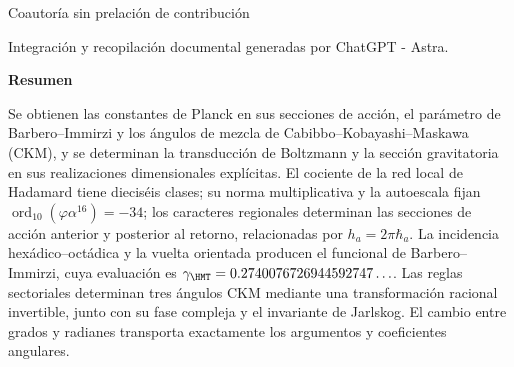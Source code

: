 \thispagestyle{plain}
\enlargethispage{2\baselineskip}
\begingroup
\centering
\setlength{\parskip}{0pt}
{\fontsize{17}{20.5}\selectfont\bfseries\Titulo\par}
\vspace{2pt}
{\fontsize{12}{14.5}\selectfont\Subtitulo\par}
\vspace{5pt}
{\fontsize{11.5}{14}\selectfont\Autores\par}
\vspace{2pt}
{\fontsize{8}{10}\selectfont Coautoría sin prelación de contribución\par}
\vspace{2pt}
{\fontsize{8}{10}\selectfont Integración y recopilación documental generadas por ChatGPT - Astra.\par}
\par\endgroup
\vspace{6pt}
\begingroup\centering\bfseries Resumen\par\endgroup
\vspace{3pt}
\begingroup
\fontsize{9.5}{10.7}\selectfont
\fontsize{9.5}{10.7}\selectfont
\setlength{\parskip}{1.5pt plus .5pt minus .5pt}
\noindent
Se obtienen las constantes de Planck en sus secciones de acción, el parámetro de
Barbero--Immirzi y los ángulos de mezcla de Cabibbo--Kobayashi--Maskawa
(CKM), y se determinan la
transducción de Boltzmann y la sección gravitatoria en sus realizaciones
dimensionales explícitas. El cociente de la red local de Hadamard tiene
dieciséis clases; su norma multiplicativa y la autoescala fijan
\(\operatorname{ord}_{10}(\varphi\alpha^{16})=-34\);
los caracteres regionales determinan las secciones de acción anterior y
posterior al retorno, relacionadas por \(h_a=2\pi\hbar_a\).
La incidencia hexádico--octádica y la vuelta orientada producen el
funcional de Barbero--Immirzi, cuya evaluación es
\(\gamma_{\HMT}=0.2740076726944592747\ldots\).
Las reglas sectoriales determinan tres ángulos CKM mediante una
transformación racional invertible, junto con su fase compleja y el
invariante de Jarlskog. El cambio entre grados y radianes transporta
exactamente los argumentos y coeficientes angulares.

